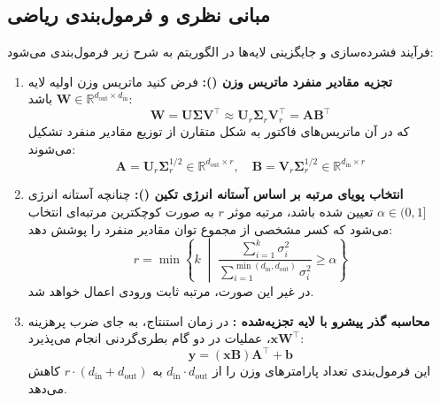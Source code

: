 \subsection{مبانی نظری و فرمول‌بندی ریاضی}
فرآیند فشرده‌سازی و جایگزینی لایه‌ها در الگوریتم  به شرح زیر فرمول‌بندی می‌شود:
\begin{enumerate}
    \item \textbf{تجزیه مقادیر منفرد ماتریس وزن ():}
    فرض کنید ماتریس وزن اولیه لایه $\mathbf{W} \in \mathbb{R}^{d_{\text{out}} \times d_{\text{in}}}$ باشد:
    \begin{equation}
    \mathbf{W} = \mathbf{U} \boldsymbol{\Sigma} \mathbf{V}^\top \approx \mathbf{U}_r \boldsymbol{\Sigma}_r \mathbf{V}_r^\top = \mathbf{A} \mathbf{B}^\top
    \end{equation}
    که در آن ماتریس‌های فاکتور به شکل متقارن از توزیع مقادیر منفرد تشکیل می‌شوند:
    \begin{equation}
    \mathbf{A} = \mathbf{U}_r \boldsymbol{\Sigma}_r^{1/2} \in \mathbb{R}^{d_{\text{out}} \times r}, \quad \mathbf{B} = \mathbf{V}_r \boldsymbol{\Sigma}_r^{1/2} \in \mathbb{R}^{d_{\text{in}} \times r}
    \end{equation}
    \item \textbf{انتخاب پویای مرتبه بر اساس آستانه انرژی تکین ():}
    چنانچه آستانه انرژی $\alpha \in (0, 1]$ تعیین شده باشد، مرتبه موثر $r$ به صورت کوچکترین مرتبه‌ای انتخاب می‌شود که کسر مشخصی از مجموع توان مقادیر منفرد را پوشش دهد:
    \begin{equation}
    r = \min \left\{ k \;\middle|\; \frac{\sum_{i=1}^k \sigma_i^2}{\sum_{i=1}^{\min(d_{\text{in}}, d_{\text{out}})} \sigma_i^2} \ge \alpha \right\}
    \end{equation}
    در غیر این صورت، مرتبه ثابت ورودی اعمال خواهد شد.
    \item \textbf{محاسبه گذر پیشرو با لایه تجزیه‌شده :}
    در زمان استنتاج، به جای ضرب پرهزینه $\mathbf{x} \mathbf{W}^\top$، عملیات در دو گام بطری‌گردنی انجام می‌پذیرد:
    \begin{equation}
    \mathbf{y} = (\mathbf{x} \mathbf{B}) \mathbf{A}^\top + \mathbf{b}
    \end{equation}
    این فرمول‌بندی تعداد پارامترهای وزن را از $d_{\text{in}} \cdot d_{\text{out}}$ به $r \cdot (d_{\text{in}} + d_{\text{out}})$ کاهش می‌دهد.
\end{enumerate}

